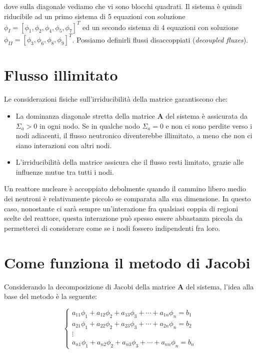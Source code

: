dove sulla diagonale vediamo che vi sono blocchi quadrati. Il sistema è quindi riducibile ad un primo sistema di 5 equazioni con soluzione
$\phi_I = [\phi_1, \phi_2, \phi_4, \phi_5, \phi_7]^T$ ed un secondo
sistema di 4 equazioni con soluzione
$\phi_{II} = [\phi_3, \phi_6, \phi_8, \phi_9]^T$. Possiamo definirli flussi disaccoppiati (\emph{decoupled fluxes}).



%
%
%
\section*{Flusso illimitato}

Le considerazioni fisiche sull'irriducibilità della matrice garantiscono che:

\begin{itemize}
	\item La dominanza diagonale stretta della matrice $\mathbf{A}$ del sistema è assicurata da $\Sigma_a > 0$ in ogni nodo. Se in qualche nodo $\Sigma_a = 0$ e non ci sono perdite verso i nodi adiacenti, il flusso neutronico diventerebbe illimitato, a meno che non ci siano interazioni con altri nodi.
	\item L’irriducibilità della matrice assicura che il flusso resti limitato, grazie alle influenze mutue tra tutti i nodi.
\end{itemize}

Un reattore nucleare è accoppiato debolmente quando il cammino libero medio dei neutroni è relativamente piccolo se comparata alla sua dimensione.
In questo caso, nonostante ci sarà sempre un'interazione fra qualsiasi coppia di regioni scelte del reattore, questa interazione può spesso essere abbastanza piccola da permetterci di considerare come se i nodi fossero indipendenti fra loro.


\section{Come funziona il metodo di Jacobi}

Considerando la decomposizione di Jacobi della matrice \(\mathbf{A}\) del sistema, l'idea alla base del metodo è la seguente:

\begin{equation*}
	\begin{cases}
		a_{11} \phi_1 + a_{12} \phi_2 + a_{13} \phi_3 + \cdots + a_{1n} \phi_n = b_1 \\
		a_{21} \phi_1 + a_{22} \phi_2 + a_{23} \phi_3 + \cdots + a_{2n} \phi_n = b_2 \\
		\vdots \\
		a_{n1} \phi_1 + a_{n2} \phi_2 + a_{n3} \phi_3 + \cdots + a_{nn} \phi_n = b_n
	\end{cases}
	\label{eq:sistema_jacobi}
\end{equation*}

